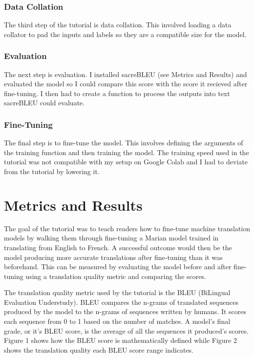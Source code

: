 \documentclass[10pt,twocolumn]{article}
\begin{document}
\subsubsection{Data Collation}
\hspace{\parindent}The third step of the tutorial is data collation. This involved loading a data collator to pad the inputs and labels so they are a compatible size for the model. 

\subsubsection{Evaluation}
\hspace{\parindent}The next step is evaluation. I installed sacreBLEU (see Metrics and Results) and evaluated the model so I could compare this score with the score it recieved after fine-tuning. I then had to create a function to process the outputs into text sacreBLEU could evaluate.

\subsubsection{Fine-Tuning}
\hspace{\parindent}The final step is to fine-tune the model. This involves defining the arguments of the training function and then training the model. The training speed used in the tutorial was not compatible with my setup on Google Colab and I had to deviate from the tutorial by lowering it. 

\section{Metrics and Results}
The goal of the tutorial was to teach readers how to fine-tune machine translation models by walking them through fine-tuning a Marian model trained in translating from English to French. A successful outcome would then be the model producing more accurate translations after fine-tuning than it was beforehand. This can be measured by evaluating the model before and after fine-tuning using a translation quality metric and comparing the scores. 

The translation quality metric used by the tutorial is the BLEU (BiLingual Evaluation Understudy). BLEU compares the n-grams of translated sequences produced by the model to the n-grams of sequences written by humans. It scores each sequence from 0 to 1 based on the number of matches. A model's final grade, or it's BLEU score, is the average of all the sequences it produced's scores. Figure 1 shows how the BLEU score is mathematically defined while Figure 2 shows the translation quality each BLEU score range indicates.
\end{document}
